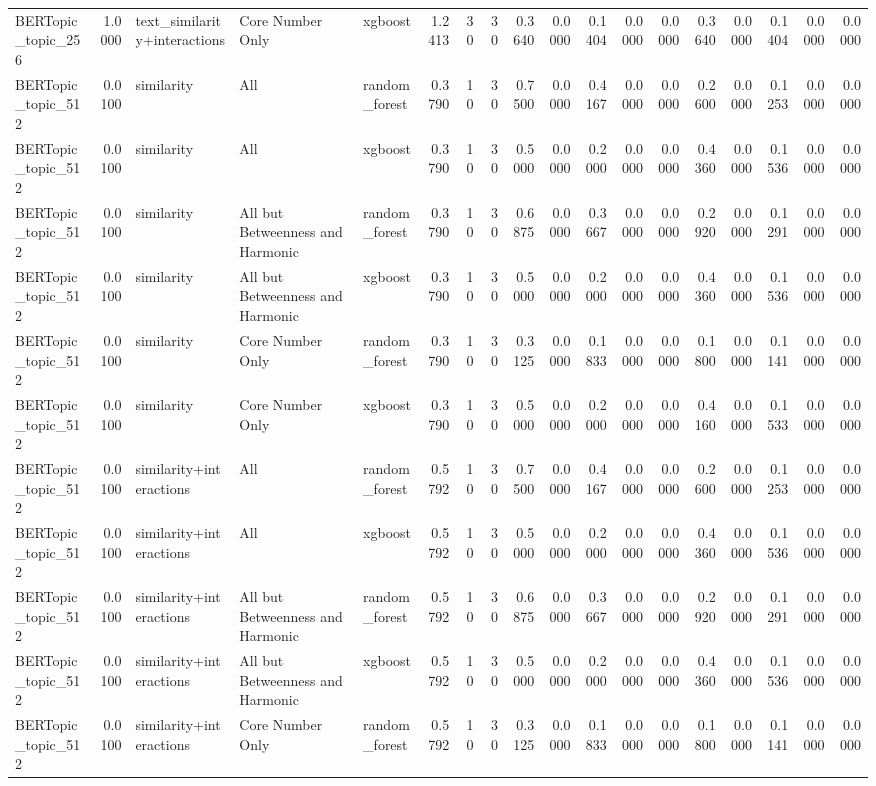 \begin{tabular}{lrlllrrrrrrrrrrrrr}
BERTopic_topic_256 & 1.0000 & text_similarity+interactions & Core Number Only & xgboost & 1.2413 & 30 & 30 & 0.3640 & 0.0000 & 0.1404 & 0.0000 & 0.0000 & 0.3640 & 0.0000 & 0.1404 & 0.0000 & 0.0000 \\
BERTopic_topic_512 & 0.0100 & similarity & All & random_forest & 0.3790 & 10 & 30 & 0.7500 & 0.0000 & 0.4167 & 0.0000 & 0.0000 & 0.2600 & 0.0000 & 0.1253 & 0.0000 & 0.0000 \\
BERTopic_topic_512 & 0.0100 & similarity & All & xgboost & 0.3790 & 10 & 30 & 0.5000 & 0.0000 & 0.2000 & 0.0000 & 0.0000 & 0.4360 & 0.0000 & 0.1536 & 0.0000 & 0.0000 \\
BERTopic_topic_512 & 0.0100 & similarity & All but Betweenness and Harmonic & random_forest & 0.3790 & 10 & 30 & 0.6875 & 0.0000 & 0.3667 & 0.0000 & 0.0000 & 0.2920 & 0.0000 & 0.1291 & 0.0000 & 0.0000 \\
BERTopic_topic_512 & 0.0100 & similarity & All but Betweenness and Harmonic & xgboost & 0.3790 & 10 & 30 & 0.5000 & 0.0000 & 0.2000 & 0.0000 & 0.0000 & 0.4360 & 0.0000 & 0.1536 & 0.0000 & 0.0000 \\
BERTopic_topic_512 & 0.0100 & similarity & Core Number Only & random_forest & 0.3790 & 10 & 30 & 0.3125 & 0.0000 & 0.1833 & 0.0000 & 0.0000 & 0.1800 & 0.0000 & 0.1141 & 0.0000 & 0.0000 \\
BERTopic_topic_512 & 0.0100 & similarity & Core Number Only & xgboost & 0.3790 & 10 & 30 & 0.5000 & 0.0000 & 0.2000 & 0.0000 & 0.0000 & 0.4160 & 0.0000 & 0.1533 & 0.0000 & 0.0000 \\
BERTopic_topic_512 & 0.0100 & similarity+interactions & All & random_forest & 0.5792 & 10 & 30 & 0.7500 & 0.0000 & 0.4167 & 0.0000 & 0.0000 & 0.2600 & 0.0000 & 0.1253 & 0.0000 & 0.0000 \\
BERTopic_topic_512 & 0.0100 & similarity+interactions & All & xgboost & 0.5792 & 10 & 30 & 0.5000 & 0.0000 & 0.2000 & 0.0000 & 0.0000 & 0.4360 & 0.0000 & 0.1536 & 0.0000 & 0.0000 \\
BERTopic_topic_512 & 0.0100 & similarity+interactions & All but Betweenness and Harmonic & random_forest & 0.5792 & 10 & 30 & 0.6875 & 0.0000 & 0.3667 & 0.0000 & 0.0000 & 0.2920 & 0.0000 & 0.1291 & 0.0000 & 0.0000 \\
BERTopic_topic_512 & 0.0100 & similarity+interactions & All but Betweenness and Harmonic & xgboost & 0.5792 & 10 & 30 & 0.5000 & 0.0000 & 0.2000 & 0.0000 & 0.0000 & 0.4360 & 0.0000 & 0.1536 & 0.0000 & 0.0000 \\
BERTopic_topic_512 & 0.0100 & similarity+interactions & Core Number Only & random_forest & 0.5792 & 10 & 30 & 0.3125 & 0.0000 & 0.1833 & 0.0000 & 0.0000 & 0.1800 & 0.0000 & 0.1141 & 0.0000 & 0.0000 \\

\end{tabular}
